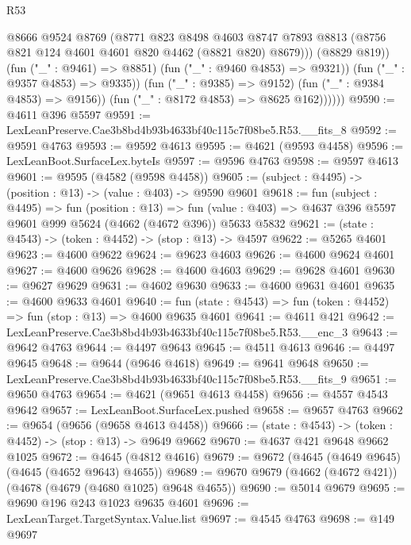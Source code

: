 \begin{lexlean}{R53}
\begin{coremodule}
                        @8666
                        @9524
                        @8769
                        (@8771
                          @823
                          @8498
                          @4603
                          @8747
                          @7893
                          @8813
                          (@8756 @821 @124 @4601 @4601 @820 @4462 (@8821 @820) @8679)))
                      (@8829 @819))
                    (fun ("_" : @9461) => @8851)
                    (fun ("_" : @9460 @4853) => @9321))
                  (fun ("_" : @9357 @4853) => @9335))
                (fun ("_" : @9385) => @9152)
                (fun ("_" : @9384 @4853) => @9156))
              (fun ("_" : @8172 @4853) => @8625 @162))))))
@9590 := @4611 @396 @5597
@9591 := LexLeanPreserve.Cae3b8bd4b93b4633bf40c115c7f08be5.R53.__fits_8
@9592 := @9591 @4763
@9593 := @9592 @4613
@9595 := @4621 (@9593 @4458)
@9596 := LexLeanBoot.SurfaceLex.byteIs
@9597 := @9596 @4763
@9598 := @9597 @4613
@9601 := @9595 (@4582 (@9598 @4458))
@9605 := (subject : @4495) -> (position : @13) -> (value : @403) -> @9590 @9601
@9618 := fun (subject : @4495) =>
  fun (position : @13) =>
  fun (value : @403) => @4637 @396 @5597 @9601 @999 @5624 (@4662 (@4672 @396)) @5633 @5832
@9621 := (state : @4543) -> (token : @4452) -> (stop : @13) -> @4597
@9622 := @5265 @4601
@9623 := @4600 @9622
@9624 := @9623 @4603
@9626 := @4600 @9624 @4601
@9627 := @4600 @9626
@9628 := @4600 @4603
@9629 := @9628 @4601
@9630 := @9627 @9629
@9631 := @4602 @9630
@9633 := @4600 @9631 @4601
@9635 := @4600 @9633 @4601
@9640 := fun (state : @4543) => fun (token : @4452) => fun (stop : @13) => @4600 @9635 @4601
@9641 := @4611 @421
@9642 := LexLeanPreserve.Cae3b8bd4b93b4633bf40c115c7f08be5.R53.__enc_3
@9643 := @9642 @4763
@9644 := @4497 @9643
@9645 := @4511 @4613
@9646 := @4497 @9645
@9648 := @9644 (@9646 @4618)
@9649 := @9641 @9648
@9650 := LexLeanPreserve.Cae3b8bd4b93b4633bf40c115c7f08be5.R53.__fits_9
@9651 := @9650 @4763
@9654 := @4621 (@9651 @4613 @4458)
@9656 := @4557 @4543 @9642
@9657 := LexLeanBoot.SurfaceLex.pushed
@9658 := @9657 @4763
@9662 := @9654 (@9656 (@9658 @4613 @4458))
@9666 := (state : @4543) -> (token : @4452) -> (stop : @13) -> @9649 @9662
@9670 := @4637 @421 @9648 @9662 @1025
@9672 := @4645 (@4812 @4616)
@9679 := @9672 (@4645 (@4649 @9645) (@4645 (@4652 @9643) @4655))
@9689 := @9670 @9679 (@4662 (@4672 @421)) (@4678 (@4679 (@4680 @1025) @9648 @4655))
@9690 := @5014 @9679
@9695 := @9690 @196 @243 @1023 @9635 @4601
@9696 := LexLeanTarget.TargetSyntax.Value.list
@9697 := @4545 @4763
@9698 := @149 @9697

\end{coremodule}
\end{lexlean}
